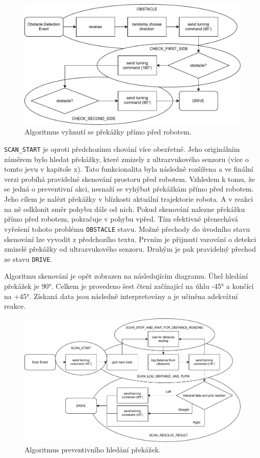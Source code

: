 \begin{figure}[h!]
	\centering
	\includegraphics[scale=0.75]{obrazky-figures/wandering_obstacle_diagram.pdf}
	\caption{Algoritmus vyhnutí se překážky přímo před robotem.}
	\label{}
\end{figure}

\verb|SCAN_START| je oproti předchozímu chování více obezřetné. Jeho originálním záměrem bylo hledat překážky, které zmizely z ultrazvukového senzoru (více o tomto jevu v kapitole x). Tato funkcionalita byla následně rozšířena a ve finální verzi probíhá pravidelné skenování prostoru před robotem. Vzhledem k tomu, že se jedná o preventivní akci, nesnaží se vyhýbat překážkám přímo před robotem. Jeho cílem je nalézt překážky v blízkosti aktuální trajektorie robota. A v reakci na ně odklonit směr pohybu dále od nich. Pokud skenování nalezne překážku přímo před robotem, pokračuje v pohybu vpřed. Tím efektivně přenechává vyřešení tohoto problému \verb|OBSTACLE| stavu. Možné přechody do úvodního stavu skenování lze vyvodit z předchozího textu. Prvním je přijmutí varování o detekci zmizelé překážky od ultrazvukového senzoru. Druhým je pak pravidelný přechod ze stavu \verb|DRIVE|. 

Algoritmu skenování je opět zobrazen na následujícím diagramu. Úhel hledání překážek je 90°. Celkem je provedeno šest čtení začínající na úhlu -45° a končící na +45°. Získaná data jsou následně interpretovány a je učiněna adekvátní reakce.

\begin{figure}[h!]
	\centering
	\includegraphics[scale=0.65]{obrazky-figures/wandering_scan_diagram.pdf}
	\caption{Algoritmus preventivního hledání překážek.}
	\label{}
\end{figure}

